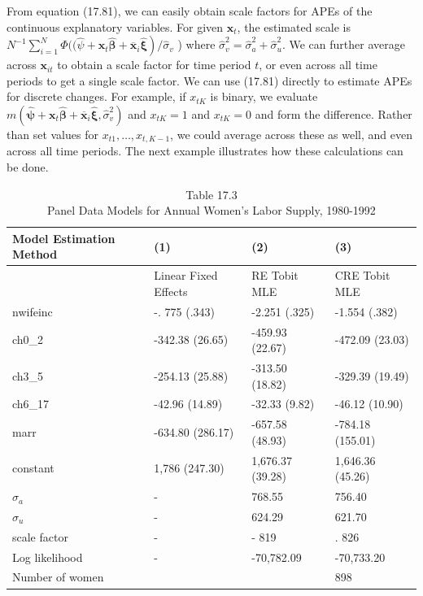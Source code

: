 \documentclass[10pt]{article}
\begin{document}
From equation (17.81), we can easily obtain scale factors for APEs of the continuous explanatory variables. For given $\mathbf{x}_{t}$, the estimated scale is $N^{-1} \sum_{i=1}^{N} \Phi((\hat{\psi}+ \left.\mathbf{x}_{t} \hat{\boldsymbol{\beta}}+\overline{\mathbf{x}}_{i} \hat{\boldsymbol{\xi}}\right) / \hat{\sigma}_{v}$ ) where $\hat{\sigma}_{v}^{2}=\hat{\sigma}_{a}^{2}+\hat{\sigma}_{u}^{2}$. We can further average across $\mathbf{x}_{i t}$ to obtain a scale factor for time period $t$, or even across all time periods to get a single scale factor. We can use (17.81) directly to estimate APEs for discrete changes. For example, if $x_{t K}$ is binary, we evaluate $m\left(\hat{\boldsymbol{\psi}}+\mathbf{x}_{t} \hat{\boldsymbol{\beta}}+\overline{\mathbf{x}}_{i} \hat{\boldsymbol{\xi}}, \hat{\sigma}_{v}^{2}\right)$ and $x_{t K}=1$ and $x_{t K}=0$ and form the difference. Rather than set values for $x_{t 1}, \ldots, x_{t, K-1}$, we could average across these as well, and even across all time periods. The next example illustrates how these calculations can be done.

\begin{table}[h]
\begin{center}
\captionsetup{labelformat=empty}
\caption{Table 17.3\\
Panel Data Models for Annual Women's Labor Supply, 1980-1992}
\begin{tabular}{|l|l|l|l|}
\hline
\multirow[b]{2}{*}{Model Estimation Method} & (1) & (2) & (3) \\
\hline
 & Linear Fixed Effects & RE Tobit MLE & CRE Tobit MLE \\
\hline
nwifeinc & -. 775 (.343) & -2.251 (.325) & -1.554 (.382) \\
\hline
ch0\_2 & -342.38 (26.65) & -459.93 (22.67) & -472.09 (23.03) \\
\hline
ch3\_5 & -254.13 (25.88) & -313.50 (18.82) & -329.39 (19.49) \\
\hline
ch6\_17 & -42.96 (14.89) & -32.33 (9.82) & -46.12 (10.90) \\
\hline
marr & -634.80 (286.17) & -657.58 (48.93) & -784.18 (155.01) \\
\hline
constant & 1,786 (247.30) & 1,676.37 (39.28) & 1,646.36 (45.26) \\
\hline
$\hat{\sigma}_{a}$ & - & 768.55 & 756.40 \\
\hline
$\hat{\sigma}_{u}$ & - & 624.29 & 621.70 \\
\hline
scale factor & - & - 819 & . 826 \\
\hline
Log likelihood & - & -70,782.09 & -70,733.20 \\
\hline
Number of women &  &  & 898 \\
\hline
\end{tabular}
\end{center}
\end{table}
\end{document}
